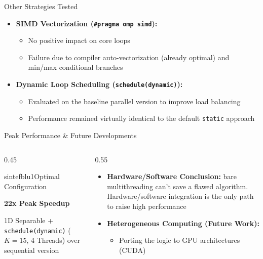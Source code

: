 \documentclass{beamer}
\begin{document}
\begin{frame}{Other Strategies Tested}
  \begin{itemize}
    \item \textbf{SIMD Vectorization (\texttt{\#pragma omp simd}):}
      \begin{itemize}
        \item No positive impact on core loops
        \item Failure due to compiler auto-vectorization (already optimal) and min/max conditional branches
      \end{itemize}
    \vspace{0.3cm}
    \item \textbf{Dynamic Loop Scheduling (\texttt{schedule(dynamic)}):}
      \begin{itemize}
        \item Evaluated on the baseline parallel version to improve load balancing
        \item Performance remained virtually identical to the default \texttt{static} approach
      \end{itemize}
  \end{itemize}
\end{frame}

\begin{frame}{Peak Performance \& Future Developments}
  \begin{columns}
    \begin{column}{0.45\textwidth}
      \begin{colorblock}[white]{sintefblu1}{Optimal Configuration}
        \begin{center}
          \Large \textbf{22x Peak Speedup}
        \end{center}
        1D Separable + \texttt{schedule(dynamic)} ($K=15$, 4 Threads) over sequential version
      \end{colorblock}
    \end{column}
    \begin{column}{0.55\textwidth}
      \begin{itemize}
        \item \textbf{Hardware/Software Conclusion:} bare multithreading can't save a flawed algorithm. Hardware/software integration is the only path to raise high performance
        \item \textbf{Heterogeneous Computing (Future Work):}
          \begin{itemize}
            \item Porting the logic to GPU architectures (CUDA)
          \end{itemize}
      \end{itemize}
    \end{column}
  \end{columns}
\end{frame}
\end{document}
